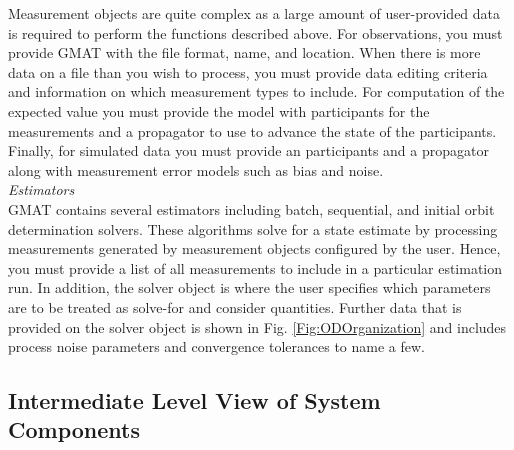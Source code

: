 Measurement objects are quite complex as a large amount of
user-provided data is required to perform the functions described
above.  For observations, you must provide GMAT with the file
format, name, and location.  When there is more data on a file than
you wish to process, you must provide data editing criteria and
information on which measurement types to include.  For computation
of the expected value you must provide the model with participants
for the measurements and a propagator to use to advance the state of
the participants.  Finally, for simulated data you must provide an
participants and a propagator along with measurement error models
such as bias and noise.\\

\textit{Estimators}\\

GMAT contains several estimators including batch, sequential, and
initial orbit determination solvers.  These algorithms solve for a
state estimate by processing measurements generated by measurement
objects configured by the user.  Hence, you must provide a list of
all measurements to include in a particular estimation run.  In
addition, the solver object is where the user specifies which
parameters are to be treated as solve-for and consider quantities.
Further data that is provided on the solver object is shown in Fig.
\ref{Fig:ODOrganization} and includes process noise parameters and
convergence tolerances to name a few.

\subsection{Intermediate Level View of System Components}


%






